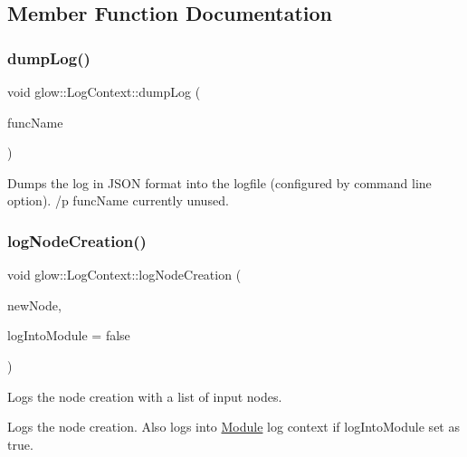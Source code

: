 \subsection{Member Function Documentation}
\mbox{\label{classglow_1_1_log_context_a72bcf17196ebe196cc7069f6b53d8489}} 
\subsubsection{\texorpdfstring{dump\+Log()}{dumpLog()}}
{\footnotesize\ttfamily void glow\+::\+Log\+Context\+::dump\+Log (\begin{DoxyParamCaption}\item[{llvm\+::\+String\+Ref}]{func\+Name }\end{DoxyParamCaption})}

Dumps the log in J\+S\+ON format into the logfile (configured by command line option). /p func\+Name currently unused. \mbox{\label{classglow_1_1_log_context_acf1c637611e33d3677d943bd89c240d1}} 
\subsubsection{\texorpdfstring{log\+Node\+Creation()}{logNodeCreation()}}
{\footnotesize\ttfamily void glow\+::\+Log\+Context\+::log\+Node\+Creation (\begin{DoxyParamCaption}\item[{const \hyperlink{classglow_1_1_node}{Node} \&}]{new\+Node,  }\item[{bool}]{log\+Into\+Module = {\ttfamily false} }\end{DoxyParamCaption})}



Logs the node creation with a list of input nodes. 

Logs the node creation. Also logs into \hyperlink{classglow_1_1_module}{Module} log context if {\ttfamily log\+Into\+Module} set as true. \mbox{\label{classglow_1_1_log_context_aa50d06ca59c680f4faa4339644584226}} 
